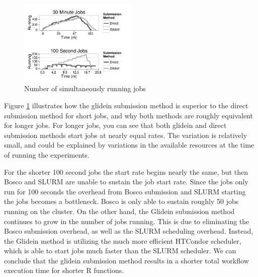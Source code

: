\documentclass[conference]{IEEEtran}
\begin{document}
\begin{figure}[ht!]
\centering
\includegraphics[width=0.5\textwidth]{images/NumberRunning.pdf}

\caption{Number of simultaneously running jobs}
\label{fig:runningjobs}
\end{figure}

Figure \ref{fig:runningjobs} illustrates how the glidein submission method is superior to the direct submission method for short jobs, and why both methods are roughly equivalent for longer jobs.  For longer jobs, you can see that both glidein and direct submission methods start jobs at nearly equal rates.  The variation is relatively small, and could be explained by variations in the available resources at the time of running the experiments. 

For the shorter 100 second jobs the start rate begins nearly the same, but then Bosco and SLURM are unable to sustain the job start rate.  Since the jobs only run for 100 seconds the overhead from Bosco submission and SLURM starting the jobs becomes a bottleneck.  Bosco is only able to sustain roughly 50 jobs running on the cluster.  On the other hand, the Glidein submission method continues to grow in the number of jobs running.  This is due to eliminating the Bosco submission overhead, as well as the SLURM scheduling overhead.  Instead, the Glidein method is utilizing the much more efficient HTCondor scheduler, which is able to start jobs much faster than the SLURM scheduler.  We can conclude that the glidein submission method results in a shorter total workflow execution time for shorter R functions.



%
%
\end{document}
